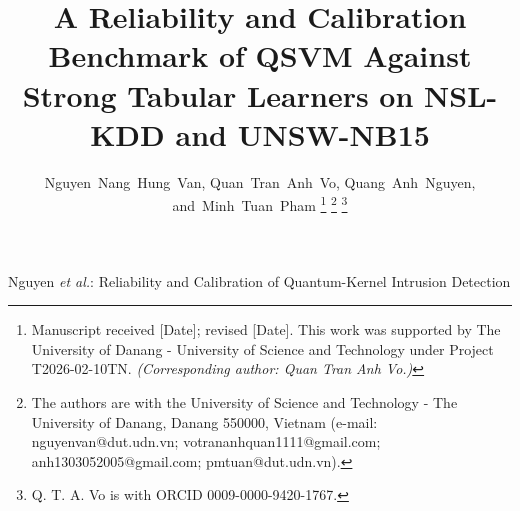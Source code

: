 \documentclass[journal]{IEEEtran}
\begin{document}
\let\flushbottom\raggedbottom
\raggedbottom

\title{A Reliability and Calibration Benchmark of QSVM Against Strong
  Tabular Learners on NSL-KDD and UNSW-NB15}

\author{Nguyen~Nang~Hung~Van,
        Quan~Tran~Anh~Vo,
        Quang~Anh~Nguyen,
        and~Minh~Tuan~Pham
\thanks{Manuscript received [Date]; revised [Date]. This work was
  supported by The University of Danang - University of Science and
  Technology under Project T2026-02-10TN. \textit{(Corresponding author: Quan Tran Anh Vo.)}}
\thanks{The authors are with the University of Science and Technology -
  The University of Danang, Danang 550000, Vietnam (e-mail:
  nguyenvan@dut.udn.vn; votrananhquan1111@gmail.com;
  anh1303052005@gmail.com; pmtuan@dut.udn.vn).}
\thanks{Q. T. A. Vo is with ORCID 0009-0000-9420-1767.}}

%
{Nguyen \MakeLowercase{\textit{et al.}}: Reliability and Calibration of Quantum-Kernel Intrusion Detection}

\maketitle
\end{document}
